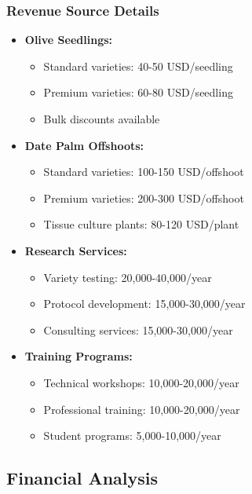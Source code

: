 \subsubsection{Revenue Source Details}
\begin{itemize}
    \item \textbf{Olive Seedlings:}
    \begin{itemize}
        \item Standard varieties: 40-50 USD/seedling
        \item Premium varieties: 60-80 USD/seedling
        \item Bulk discounts available
    \end{itemize}
    
    \item \textbf{Date Palm Offshoots:}
    \begin{itemize}
        \item Standard varieties: 100-150 USD/offshoot
        \item Premium varieties: 200-300 USD/offshoot
        \item Tissue culture plants: 80-120 USD/plant
    \end{itemize}
    
    \item \textbf{Research Services:}
    \begin{itemize}
        \item Variety testing: 20,000-40,000/year
        \item Protocol development: 15,000-30,000/year
        \item Consulting services: 15,000-30,000/year
    \end{itemize}
    
    \item \textbf{Training Programs:}
    \begin{itemize}
        \item Technical workshops: 10,000-20,000/year
        \item Professional training: 10,000-20,000/year
        \item Student programs: 5,000-10,000/year
    \end{itemize}
\end{itemize}

\subsection{Financial Analysis}

